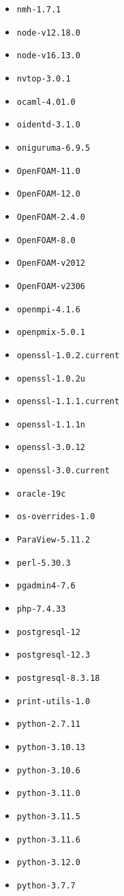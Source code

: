 \begin{multicols}{3}
\begin{itemize}
\item \verb|nmh-1.7.1|
\item \verb|node-v12.18.0|
\item \verb|node-v16.13.0|
\item \verb|nvtop-3.0.1|
\item \verb|ocaml-4.01.0|
\item \verb|oidentd-3.1.0|
\item \verb|oniguruma-6.9.5|
\item \verb|OpenFOAM-11.0|
\item \verb|OpenFOAM-12.0|
\item \verb|OpenFOAM-2.4.0|
\item \verb|OpenFOAM-8.0|
\item \verb|OpenFOAM-v2012|
\item \verb|OpenFOAM-v2306|
\item \verb|openmpi-4.1.6|
\item \verb|openpmix-5.0.1|
\item \verb|openssl-1.0.2.current|
\item \verb|openssl-1.0.2u|
\item \verb|openssl-1.1.1.current|
\item \verb|openssl-1.1.1n|
\item \verb|openssl-3.0.12|
\item \verb|openssl-3.0.current|
\item \verb|oracle-19c|
\item \verb|os-overrides-1.0|
\item \verb|ParaView-5.11.2|
\item \verb|perl-5.30.3|
\item \verb|pgadmin4-7.6|
\item \verb|php-7.4.33|
\item \verb|postgresql-12|
\item \verb|postgresql-12.3|
\item \verb|postgresql-8.3.18|
\item \verb|print-utils-1.0|
\item \verb|python-2.7.11|
\item \verb|python-3.10.13|
\item \verb|python-3.10.6|
\item \verb|python-3.11.0|
\item \verb|python-3.11.5|
\item \verb|python-3.11.6|
\item \verb|python-3.12.0|
\item \verb|python-3.7.7|

\end{itemize}
\end{multicols}
